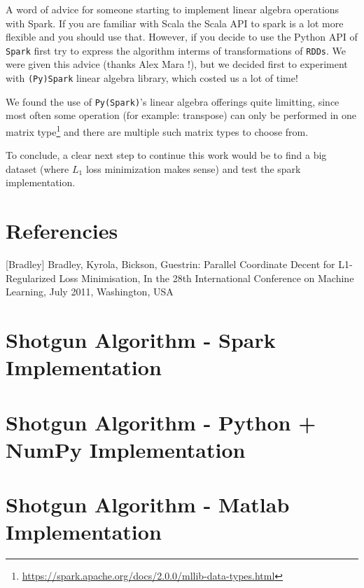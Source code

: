 \documentclass[a4paper,11pt]{article}
\begin{document}
A word of advice for someone starting to implement linear algebra operations with Spark. If you are familiar with Scala the Scala API to spark is a lot more flexible and you should use that. However, if you decide to use the Python API of \texttt{Spark} first try to express the algorithm interms of transformations of \texttt{RDDs}. We were given this advice (thanks Alex Mara !), but we decided first to experiment with \texttt{(Py)Spark} linear algebra library, which costed us a lot of time! \par
We found the use of \texttt{Py(Spark)}'s linear algebra offerings quite limitting, since most often some operation (for example: transpose) can only be performed in one matrix type\footnote{\url{https://spark.apache.org/docs/2.0.0/mllib-data-types.html}} and there are multiple such matrix types to choose from.\par

To conclude, a clear next step to continue this work would be to find a big dataset (where $L_1$ loss minimization makes sense) and test the spark implementation. \par
\section{Referencies}

[Bradley] Bradley, Kyrola, Bickson, Guestrin: Parallel Coordinate Decent for L1-Regularized Loss Minimisation, In the 28th International Conference on Machine Learning, July 2011, Washington, USA

\pagebreak
\appendix
\section{Shotgun Algorithm - Spark Implementation}\label{shotgun-spark}


\section{Shotgun Algorithm - Python + NumPy Implementation}\label{shotgun-py}


\section{Shotgun Algorithm - Matlab Implementation}\label{shotgun-mat}


\end{document}
